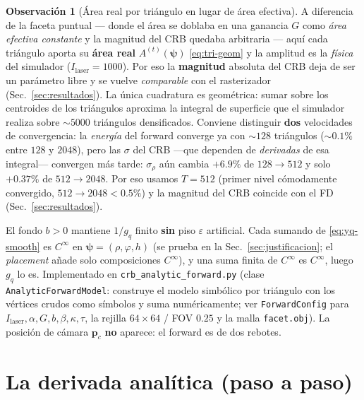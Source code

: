 \documentclass[11pt,a4paper]{article}
\theoremstyle{plain}
\theoremstyle{definition}
\newtheorem{remark}{Observaci\'on}
\newcommand{\vect}[1]{\boldsymbol{#1}}
\begin{document}
\begin{remark}[\'Area real por tri\'angulo en lugar de \'area efectiva]
\label{rem:area}
A diferencia de la faceta puntual --- donde el \'area se doblaba en una ganancia
$G$ como \emph{\'area efectiva constante} y la magnitud del CRB quedaba arbitraria
--- aqu\'i cada tri\'angulo aporta su \textbf{\'area real} $A^{(t)}(\vect\psi)$
\eqref{eq:tri-geom} y la amplitud es la \emph{f\'isica} del simulador
($I_{\mathrm{laser}}=1000$). Por eso la \textbf{magnitud} absoluta del CRB deja de
ser un par\'ametro libre y se vuelve \emph{comparable} con el rasterizador
(Sec.~\ref{sec:resultados}). La \'unica cuadratura es geom\'etrica: sumar sobre
los centroides de los tri\'angulos aproxima la integral de superficie que el
simulador realiza sobre $\sim\!5000$ tri\'angulos densificados. Conviene
distinguir \textbf{dos} velocidades de convergencia: la \emph{energ\'ia} del
forward converge ya con $\sim\!128$ tri\'angulos ($\sim\!0.1\%$ entre $128$ y $2048$),
pero las $\sigma$ del CRB ---que dependen de \emph{derivadas} de esa integral---
convergen m\'as tarde: $\sigma_\rho$ a\'un cambia $+6.9\%$ de $128\!\to\!512$ y
solo $+0.37\%$ de $512\!\to\!2048$. Por eso usamos $T=512$ (primer nivel
c\'omodamente convergido, $512\!\to\!2048<0.5\%$) y la magnitud del CRB coincide
con el FD (Sec.~\ref{sec:resultados}).
\end{remark}

El fondo $b>0$ mantiene $1/g_q$ finito \textbf{sin} piso $\varepsilon$ artificial.
Cada sumando de \eqref{eq:yq-smooth} es $C^\infty$ en $\vect{\psi}=(\rho,\varphi,h)$
(se prueba en la Sec.~\ref{sec:justificacion}; el \emph{placement} a\~nade solo
composiciones $C^\infty$), y una suma finita de $C^\infty$ es $C^\infty$, luego
$g_q$ lo es. Implementado en \texttt{crb\_analytic\_forward.py} (clase
\texttt{AnalyticForwardModel}: construye el modelo simb\'olico por tri\'angulo con
los v\'ertices crudos como s\'imbolos y suma num\'ericamente; ver
\texttt{ForwardConfig} para $I_{\mathrm{laser}},\alpha,G,b,\beta,\kappa,\tau$, la
rejilla $64\times64$ / FOV $0.25$ y la malla \texttt{facet.obj}). La posici\'on de
c\'amara $\vect{p}_c$ \textbf{no} aparece: el forward es de dos rebotes.

\section{La derivada anal\'itica (paso a paso)}
\label{sec:derivadas}
\end{document}
